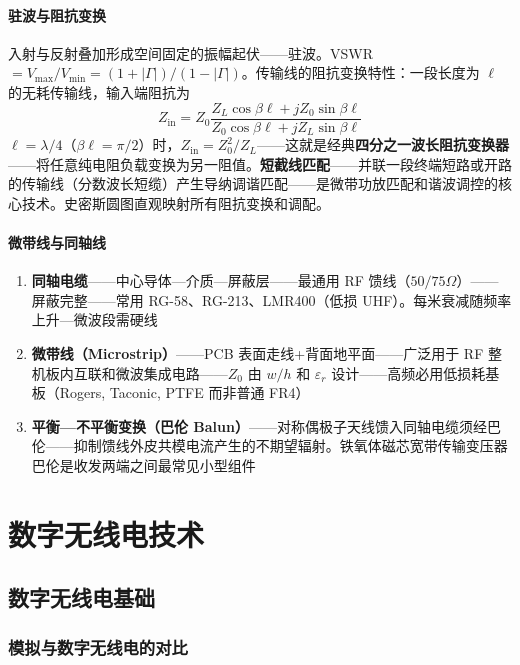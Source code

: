 \documentclass[12pt,UTF8]{ctexbook}
\begin{document}
\subsection{驻波与阻抗变换}

入射与反射叠加形成空间固定的振幅起伏——驻波。VSWR $=V_{\max}/V_{\min} = (1+|\Gamma|)/(1-|\Gamma|)$。传输线的阻抗变换特性：一段长度为 $\ell$ 的无耗传输线，输入端阻抗为
\[
Z_{\mathrm{in}} = Z_0\frac{Z_L\cos\beta\ell + jZ_0\sin\beta\ell}{Z_0\cos\beta\ell + jZ_L\sin\beta\ell}
\]
$\ell=\lambda/4$（$\beta\ell=\pi/2$）时，$Z_{\mathrm{in}} = Z_0^2 / Z_L$——这就是经典\textbf{四分之一波长阻抗变换器}——将任意纯电阻负载变换为另一阻值。\textbf{短截线匹配}——并联一段终端短路或开路的传输线（分数波长短缆）产生导纳调谐匹配——是微带功放匹配和谐波调控的核心技术。史密斯圆图直观映射所有阻抗变换和调配。

\subsection{微带线与同轴线}


\begin{enumerate}
\item \textbf{同轴电缆}——中心导体—介质—屏蔽层——最通用 RF 馈线（$50/75\Omega$）——屏蔽完整——常用 RG-58、RG-213、LMR400（低损 UHF）。每米衰减随频率上升—微波段需硬线
\item \textbf{微带线（Microstrip）}——PCB 表面走线+背面地平面——广泛用于 RF 整机板内互联和微波集成电路——$Z_0$ 由 $w/h$ 和 $\varepsilon_r$ 设计——高频必用低损耗基板（Rogers, Taconic, PTFE 而非普通 FR4）
\item \textbf{平衡—不平衡变换（巴伦 Balun）}——对称偶极子天线馈入同轴电缆须经巴伦——抑制馈线外皮共模电流产生的不期望辐射。铁氧体磁芯宽带传输变压器巴伦是收发两端之间最常见小型组件
\end{enumerate}


\part{数字无线电技术}

\chapter{数字无线电基础}
\label{chap:digital_radio_basics}

\section{模拟与数字无线电的对比}
\label{sec:analog_vs_digital}
\end{document}
